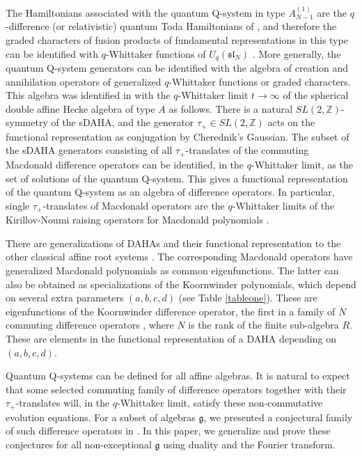 \documentclass[12pt]{amsart}
\newcommand{\g}{{\mathfrak{g}}}
\renewcommand{\sl}{{\mathfrak{sl}}}
\newcommand{\Z}{{\mathbb Z}}
\numberwithin{equation}{section}
\begin{document}
The Hamiltonians associated with the quantum Q-system in type $A_{N-1}^{(1)}$ are the $q$-difference (or relativistic) 
quantum Toda Hamiltonians of \cite{Etingof}, and therefore the graded characters of fusion products of fundamental representations in this type can be identified with $q$-Whittaker functions of $U_q(\sl_N)$ \cite{DFK15}. More generally, the quantum Q-system generators can be identified with the algebra of creation and annihilation operators of generalized $q$-Whittaker functions or graded characters. 
This algebra was identified in \cite{DFK15,DFKcur,DFKqt} with the $q$-Whittaker limit $t\to\infty$ of the spherical double affine Hecke algebra of type $A$ \cite{Cheredbook} as follows.
%
%
There is a natural $SL(2,\Z)$-symmetry of the sDAHA, and the generator $\tau_+\in SL(2,\Z)$ acts on the functional 
representation as conjugation by Cherednik's Gaussian. The subset of the sDAHA generators consisting of all 
$\tau_+$-translates of the commuting Macdonald difference operators can be identified, in the $q$-Whittaker limit, 
as the set of solutions of the quantum Q-system. This gives a functional representation of the quantum Q-system as an algebra of 
difference operators. In particular, single $\tau_+$-translates of Macdonald operators are the $q$-Whittaker limits of the Kirillov-Noumi raising 
operators for Macdonald polynomials \cite{kinoum}.

%

There are generalizations of DAHAs and their functional representation to the other classical affine root systems \cite{Cheredbook,CheredDAHA}.
The corresponding Macdonald operators have generalized Macdonald polynomials as common eigenfunctions.
%
The latter can also be obtained as specializations of the Koornwinder polynomials, which depend on several extra parameters $(a,b,c,d)$ \cite{Koornwinder,YamaYana,vandiej} (see Table \ref{tableone}). These  are eigenfunctions of the Koornwinder difference operator, the first in a family of $N$ commuting difference operators \cite{vandiej}, where $N$ is the rank of the finite sub-algebra $R$. These are elements in the functional representation \cite{Noumireps} of a DAHA depending on $(a,b,c,d)$.

Quantum Q-systems can be defined for all affine algebras.
%
%
%
It is natural to expect that some selected commuting family of difference operators together with their $\tau_+$-translates will, in the  $q$-Whittaker limit, satisfy these non-commutative evolution equations. For a subset of algebras $\g$, we presented a conjectural family of such difference operators in \cite{DFKconj}. In this paper, we generalize and prove these conjectures for all non-exceptional $\g$ using duality and the Fourier transform.
\end{document}
